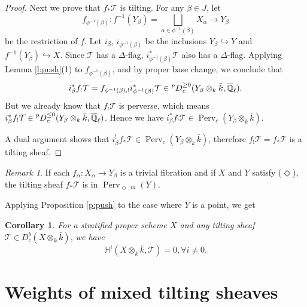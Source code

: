 \documentclass{amsart}
\theoremstyle{plain}
\newtheorem{cor}[subsubsection]{Corollary}
\theoremstyle{definition}
\theoremstyle{remark}
\newtheorem*{remark}{Remark}
\numberwithin{equation}{subsection}
\begin{document}
\begin{proof}
Next we prove that $f_*{\mathcal{T}}$ is tilting. For any $\beta\in J$, let
\begin{equation*}
f_{\phi^{-1}(\beta)}:f^{-1}(Y_\beta)=\bigsqcup_{\alpha\in\phi^{-1}(\beta)}X_\alpha\to Y_\beta
\end{equation*}
be the restriction of $f$. Let $i_\beta$, $i_{\phi^{-1}(\beta)}$ be the inclusions $Y_\beta\hookrightarrow Y$ and $f^{-1}(Y_\beta)\hookrightarrow X$. Since ${\mathcal{T}}$ has a $\Delta$-flag, $i^*_{\phi^{-1}(\beta)}{\mathcal{T}}$ also has a $\Delta$-flag. Applying Lemma \ref{l:push}(1) to $f_{\phi^{-1}(\beta)}$, and by proper base change, we conclude that
\begin{equation*}
i_\beta^*f_!{\mathcal{T}}=f_{\phi^{-1}(\beta),!}i_{\phi^{-1}(\beta)}^*{\mathcal{T}}\in{{\vphantom{{D}}}^{{p}}{{D}}}^{\geq0}_c({{Y_\beta}\otimes_k\bar{k}},{\overline{\mathbb{Q}}_{\ell}}).
\end{equation*}
But we already know that $f_!{\mathcal{T}}$ is perverse, which means $i_\beta^*f_!{\mathcal{T}}\in{{\vphantom{{D}}}^{{p}}{{D}}}^{\leq0}_c({{Y_\beta}\otimes_k\bar{k}},{\overline{\mathbb{Q}}_{\ell}})$. Hence we have $i_\beta^*f_!{\mathcal{T}}\in{\operatorname{Perv}_c({{{Y_\beta}}\otimes_k\bar{k}})}$. 

A dual argument shows that $i_\beta^!f_*{\mathcal{T}}\in{\operatorname{Perv}_c({{{Y_\beta}}\otimes_k\bar{k}})}$, therefore $f_!{\mathcal{T}}=f_*{\mathcal{T}}$ is a tilting sheaf.  
\end{proof}

\begin{remark}
If each $f_{\alpha}:X_\alpha\to Y_\beta$ is a trivial fibration and if $X$ and $Y$ satisfy ($\Diamond$), the tilting sheaf $f_*{\mathcal{T}}$ is in ${\operatorname{Perv}_{\Diamond,m}({Y})}$.
\end{remark}

Applying Proposition \ref{p:push} to the case where $Y$ is a point, we get
\begin{cor}
For a stratified proper scheme $X$ and any tilting sheaf ${\mathcal{T}}\in D^b_c({{X}\otimes_k\bar{k}})$, we have
\begin{equation*}
{\mathbb{H}}^i({{X}\otimes_k\bar{k}},{\mathcal{T}})=0,\forall i\neq0.
\end{equation*}
\end{cor}

\section{Weights of mixed tilting sheaves}
\end{document}
